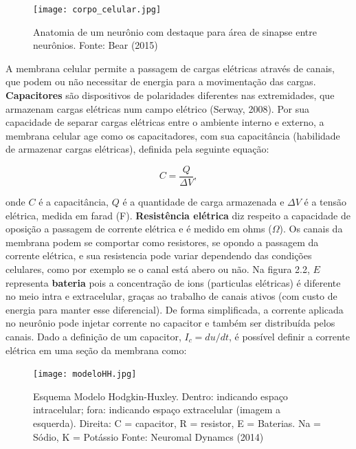 \begin{figure}
    \centering
    \texttt{[image: corpo\_celular.jpg]}
    \caption{Anatomia de um neurônio com destaque para área de sinapse entre neurônios. Fonte: Bear (2015)}
\end{figure}

A membrana celular permite a passagem de cargas elétricas através de canais, que podem ou não necessitar de energia para a movimentação
das cargas. \textbf{Capacitores} são dispositivos de polaridades diferentes nas extremidades, que armazenam
cargas elétricas num campo elétrico (Serway, 2008). Por sua capacidade de separar cargas elétricas entre o ambiente interno e externo, 
a membrana celular age como os capacitadores, com sua capacitância (habilidade de armazenar cargas elétricas), definida pela seguinte equação:

\begin{equation}
    C = \frac{Q}{\Delta V},
\end{equation}

onde $C$ é a capacitância, $Q$ é a quantidade de carga armazenada e $\Delta V$ é a tensão elétrica, medida em farad (F). 
\textbf{Resistência elétrica} diz respeito a capacidade de oposição a passagem de corrente elétrica e é medido em
 ohms ($\Omega$). Os canais da membrana podem se comportar como resistores, se opondo a passagem da corrente elétrica, e sua 
 resistencia pode variar dependendo das condições celulares, como por exemplo se o canal está abero ou  não. Na figura 2.2, $E$ representa
 \textbf{bateria} pois a concentração de ions (particulas elétricas) é diferente no meio intra e extracelular, graças ao trabalho de canais ativos (com custo de energia
 para manter esse diferencial). De forma simplificada, a corrente aplicada no neurônio pode injetar corrente no capacitor e também 
 ser distribuída pelos canais. Dado a definição de um capacitor, $I_c = d u /d t$, é possível definir a corrente elétrica em uma seção da 
 membrana como:


\begin{figure}
    \centering
    \texttt{[image: modeloHH.jpg]}
    \caption{Esquema Modelo Hodgkin-Huxley. 
    Dentro: indicando espaço intracelular; fora: indicando espaço extracelular (imagem a esquerda). Direita: 
    C = capacitor, R = resistor, E = Baterias. Na = Sódio, K = Potássio  Fonte: Neuromal Dynamcs (2014)} 
\end{figure}

